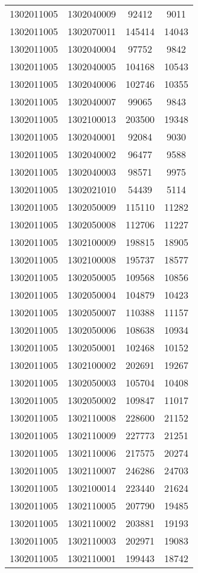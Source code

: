 \begin{longtable}{llcc}
1302011005 & 1302040009 & 92412 & 9011\\
1302011005 & 1302070011 & 145414 & 14043\\
1302011005 & 1302040004 & 97752 & 9842\\
1302011005 & 1302040005 & 104168 & 10543\\
1302011005 & 1302040006 & 102746 & 10355\\
1302011005 & 1302040007 & 99065 & 9843\\
1302011005 & 1302100013 & 203500 & 19348\\
1302011005 & 1302040001 & 92084 & 9030\\
1302011005 & 1302040002 & 96477 & 9588\\
1302011005 & 1302040003 & 98571 & 9975\\
1302011005 & 1302021010 & 54439 & 5114\\
1302011005 & 1302050009 & 115110 & 11282\\
1302011005 & 1302050008 & 112706 & 11227\\
1302011005 & 1302100009 & 198815 & 18905\\
1302011005 & 1302100008 & 195737 & 18577\\
1302011005 & 1302050005 & 109568 & 10856\\
1302011005 & 1302050004 & 104879 & 10423\\
1302011005 & 1302050007 & 110388 & 11157\\
1302011005 & 1302050006 & 108638 & 10934\\
1302011005 & 1302050001 & 102468 & 10152\\
1302011005 & 1302100002 & 202691 & 19267\\
1302011005 & 1302050003 & 105704 & 10408\\
1302011005 & 1302050002 & 109847 & 11017\\
1302011005 & 1302110008 & 228600 & 21152\\
1302011005 & 1302110009 & 227773 & 21251\\
1302011005 & 1302110006 & 217575 & 20274\\
1302011005 & 1302110007 & 246286 & 24703\\
1302011005 & 1302100014 & 223440 & 21624\\
1302011005 & 1302110005 & 207790 & 19485\\
1302011005 & 1302110002 & 203881 & 19193\\
1302011005 & 1302110003 & 202971 & 19083\\
1302011005 & 1302110001 & 199443 & 18742\\

\end{longtable}
